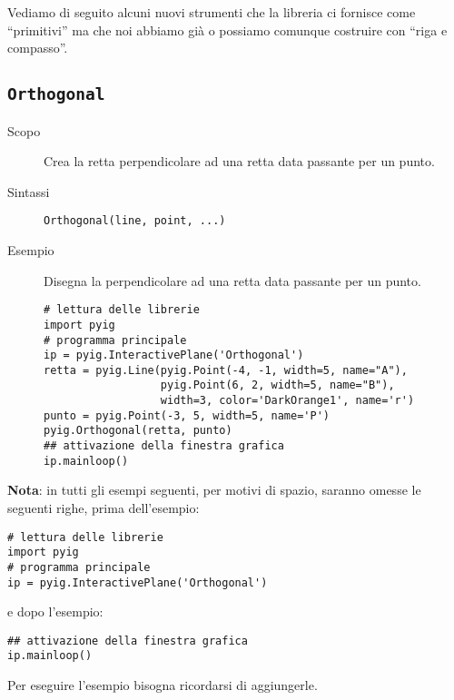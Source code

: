 

Vediamo di seguito alcuni nuovi strumenti che la libreria ci fornisce come 
``primitivi'' ma che noi abbiamo già o possiamo comunque costruire con 
``riga e compasso''.

\subsection{\lstinline{Orthogonal}}
\label{sub:geoint_orthogonal}

\begin{description} %
 \item [Scopo] Crea la retta perpendicolare ad una retta data passante per un 
punto.
 \item [Sintassi] \lstinline{Orthogonal(line, point, ...)}
% 
% 

 \item [Esempio] Disegna la perpendicolare ad una retta data passante per un 
punto.

\begin{lstlisting}
# lettura delle librerie 
import pyig
# programma principale
ip = pyig.InteractivePlane('Orthogonal')
retta = pyig.Line(pyig.Point(-4, -1, width=5, name="A"), 
                  pyig.Point(6, 2, width=5, name="B"), 
                  width=3, color='DarkOrange1', name='r')
punto = pyig.Point(-3, 5, width=5, name='P')
pyig.Orthogonal(retta, punto)
## attivazione della finestra grafica
ip.mainloop()
\end{lstlisting}

\end{description}

\begin{exrig}
 
\textbf{Nota}: 
in tutti gli esempi seguenti, per motivi di spazio, saranno omesse 
le seguenti righe, prima dell'esempio:

\begin{lstlisting}
# lettura delle librerie 
import pyig
# programma principale
ip = pyig.InteractivePlane('Orthogonal')
\end{lstlisting}
e dopo l'esempio:
\begin{lstlisting}
## attivazione della finestra grafica
ip.mainloop()
\end{lstlisting}

Per eseguire l'esempio bisogna ricordarsi di aggiungerle.

\end{exrig}

